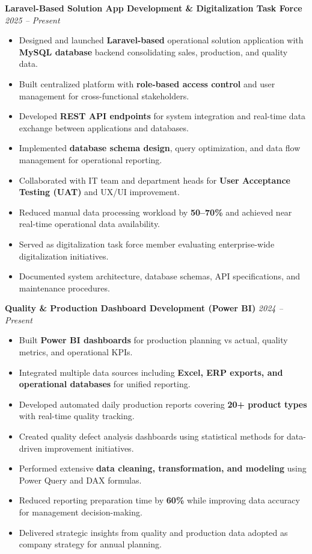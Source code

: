 \documentclass[a4paper,10pt]{article}
\begin{document}
\textbf{Laravel-Based Solution App Development \& Digitalization Task Force} \hfill \textit{2025 – Present}
\begin{itemize}
    \item Designed and launched \textbf{Laravel-based} operational solution application with \textbf{MySQL database} backend consolidating sales, production, and quality data.
    \item Built centralized platform with \textbf{role-based access control} and user management for cross-functional stakeholders.
    \item Developed \textbf{REST API endpoints} for system integration and real-time data exchange between applications and databases.
    \item Implemented \textbf{database schema design}, query optimization, and data flow management for operational reporting.
    \item Collaborated with IT team and department heads for \textbf{User Acceptance Testing (UAT)} and UX/UI improvement.
    \item Reduced manual data processing workload by \textbf{50–70\%} and achieved near real-time operational data availability.
    \item Served as digitalization task force member evaluating enterprise-wide digitalization initiatives.
    \item Documented system architecture, database schemas, API specifications, and maintenance procedures.
\end{itemize}

\vspace{6pt}

\textbf{Quality \& Production Dashboard Development (Power BI)} \hfill \textit{2024 – Present}
\begin{itemize}
    \item Built \textbf{Power BI dashboards} for production planning vs actual, quality metrics, and operational KPIs.
    \item Integrated multiple data sources including \textbf{Excel, ERP exports, and operational databases} for unified reporting.
    \item Developed automated daily production reports covering \textbf{20+ product types} with real-time quality tracking.
    \item Created quality defect analysis dashboards using statistical methods for data-driven improvement initiatives.
    \item Performed extensive \textbf{data cleaning, transformation, and modeling} using Power Query and DAX formulas.
    \item Reduced reporting preparation time by \textbf{60\%} while improving data accuracy for management decision-making.
    \item Delivered strategic insights from quality and production data adopted as company strategy for annual planning.
\end{itemize}
\end{document}
